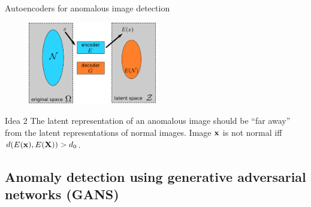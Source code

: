 \documentclass[xcolor=pdftex,dvipsnames,table,mathserif]{beamer}
\begin{document}
\begin{frame}{Autoencoders for anomalous image detection}

  \begin{figure}[ht]
    \centering
    \includegraphics[width=0.5\textwidth]{ae_ano2.png}
  \end{figure}

  \begin{block}{Idea 2}
    The latent representation of an anomalous image should be ``far away'' from the latent representations of normal images. Image $\mathbf{x}$ is not normal iff $d(E(\mathbf{x}), E(\mathbf{X})) > d_0$.
  \end{block}

\end{frame}


\subsection{Anomaly detection using generative adversarial networks (GANS)}
\end{document}

